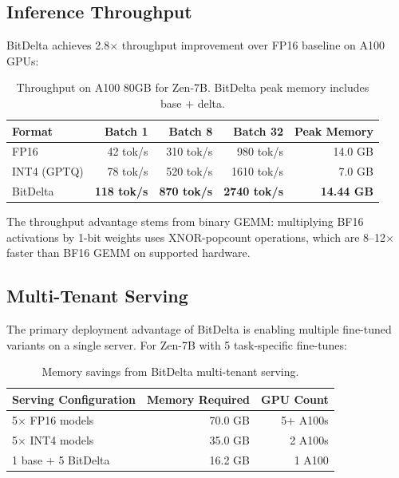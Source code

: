 \documentclass[11pt,a4paper]{article}
\begin{document}
\subsection{Inference Throughput}

BitDelta achieves 2.8$\times$ throughput improvement over FP16 baseline on A100 GPUs:

\begin{table}[H]
\centering
\begin{tabular}{lrrrr}
\toprule
\textbf{Format} & \textbf{Batch 1} & \textbf{Batch 8} & \textbf{Batch 32} & \textbf{Peak Memory} \\
\midrule
FP16 & 42 tok/s & 310 tok/s & 980 tok/s & 14.0 GB \\
INT4 (GPTQ) & 78 tok/s & 520 tok/s & 1610 tok/s & 7.0 GB \\
BitDelta & \textbf{118 tok/s} & \textbf{870 tok/s} & \textbf{2740 tok/s} & \textbf{14.44 GB} \\
\bottomrule
\end{tabular}
\caption{Throughput on A100 80GB for Zen-7B. BitDelta peak memory includes base + delta.}
\end{table}

The throughput advantage stems from binary GEMM: multiplying BF16 activations by 1-bit
weights uses XNOR-popcount operations, which are 8--12$\times$ faster than BF16 GEMM
on supported hardware.

\subsection{Multi-Tenant Serving}

The primary deployment advantage of BitDelta is enabling multiple fine-tuned variants
on a single server. For Zen-7B with 5 task-specific fine-tunes:

\begin{table}[H]
\centering
\begin{tabular}{lrr}
\toprule
\textbf{Serving Configuration} & \textbf{Memory Required} & \textbf{GPU Count} \\
\midrule
5$\times$ FP16 models & 70.0 GB & 5+ A100s \\
5$\times$ INT4 models & 35.0 GB & 2 A100s \\
1 base + 5 BitDelta & 16.2 GB & 1 A100 \\
\bottomrule
\end{tabular}
\caption{Memory savings from BitDelta multi-tenant serving.}
\end{table}
\end{document}
